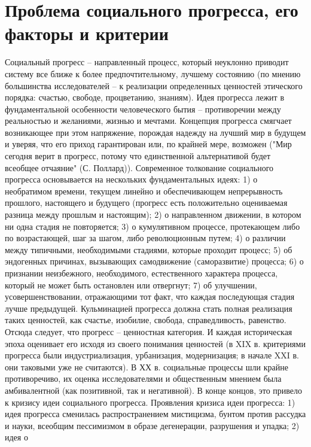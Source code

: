 \documentclass[12pt]{article}
\begin{document}
\section{Проблема социального прогресса, его факторы и критерии}
Социальный  прогресс  –  направленный  процесс,  который  неуклонно  приводит  систему  все  ближе  к  более
предпочтительному,  лучшему  состоянию  (по  мнению  большинства  исследователей  –  к  реализации
определенных ценностей этического порядка: счастью, свободе, процветанию, знаниям).
Идея  прогресса  лежит  в  фундаментальной  особенности  человеческого  бытия  –  противоречии  между
реальностью  и  желаниями,  жизнью  и  мечтами.  Концепция  прогресса  смягчает  возникающее  при  этом
напряжение, порождая надежду на лучший мир в будущем и уверяя, что его приход гарантирован или, по
крайней  мере,  возможен  ("Мир  сегодня  верит  в  прогресс,  потому  что  единственной  альтернативой  будет
всеобщее отчаяние" (С. Поллард)).
Современное толкование социального прогресса основывается на нескольких фундаментальных идеях: 1) о
необратимом времени, текущем линейно и обеспечивающем непрерывность прошлого, настоящего и будущего
(прогресс  есть  положительно  оцениваемая  разница  между  прошлым  и  настоящим);  2)  о  направленном
движении, в котором ни одна стадия не повторяется; 3) о кумулятивном процессе, протекающем либо по
возрастающей, шаг за шагом, либо революционным путем; 4) о различии между типичными, необходимыми
стадиями, которые проходит процесс; 5) об эндогенных причинах, вызывающих самодвижение (саморазвитие)
процесса; 6) о признании неизбежного, необходимого, естественного характера процесса, который не может
быть остановлен или отвергнут; 7) об улучшении, усовершенствовании, отражающими тот факт, что каждая
последующая стадия лучше предыдущей.
Кульминацией прогресса должна стать полная реализация таких ценностей, как счастье, изобилие, свобода,
справедливость, равенство. Отсюда следует, что прогресс – ценностная категория. И каждая историческая эпоха
оценивает его исходя из своего понимания ценностей (в XIX в. критериями прогресса были индустриализация,
урбанизация, модернизация; в начале XXI в. они таковыми уже не считаются).
В  ХХ  в.  социальные  процессы  шли  крайне  противоречиво,  их  оценка  исследователями  и  общественным
мнением была амбивалентной (как позитивной, так и негативной). В конце концов, это привело к кризису идеи
социального прогресса.
Проявления  кризиса  идеи  прогресса:  1)  идея  прогресса  сменилась  распространением  мистицизма,  бунтом
против  рассудка  и  науки,  всеобщим  пессимизмом  в  образе  дегенерации,  разрушения  и  упадка;  2)  идея  о
\end{document}
